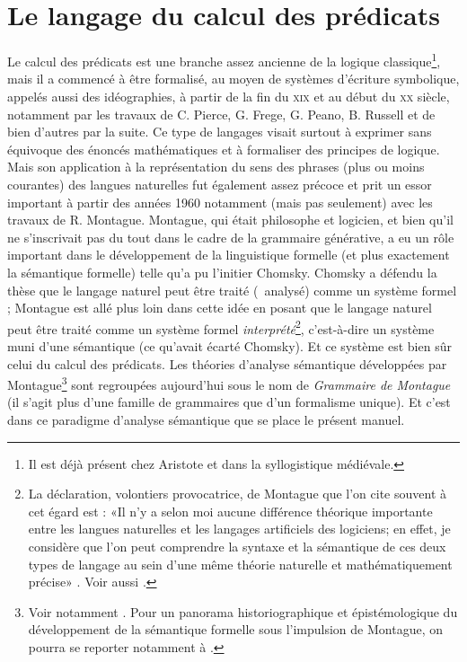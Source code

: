 \section{Le langage du calcul des prédicats}

Le calcul des prédicats est une branche assez ancienne de la logique
classique\footnote{Il est déjà présent chez Aristote et dans la
syllogistique médiévale.}, mais il a commencé à être formalisé, au
moyen de systèmes d'écriture symbolique, appelés aussi des
idéographies, à partir de la fin du \textsc{xix} et au début du \textsc{xx}
siècle, notamment par les travaux de C. Pierce, G. Frege, G. Peano,
B. Russell et de bien d'autres par la suite.  Ce type de langages
visait surtout à exprimer sans équivoque des énoncés mathématiques et
à formaliser des principes de logique.  Mais son application à la
représentation du sens des phrases (plus ou moins courantes) des
langues naturelles fut également assez précoce et prit un essor
important à partir des années 1960 notamment (mais pas seulement) avec les
travaux de R. Montague.  Montague, qui était philosophe et logicien,
et bien qu'il ne s'inscrivait pas du tout dans le cadre de la
grammaire générative, a eu un rôle important dans le développement de
la linguistique formelle (et plus exactement la sémantique formelle)
telle qu'a pu l'initier Chomsky.  Chomsky a défendu la thèse que le
langage naturel peut être traité (\ie\ analysé) comme un système formel ;
Montague est allé plus loin dans cette idée en posant que le langage
naturel peut être traité comme un système formel
\emph{interprété}\footnote{La déclaration, volontiers provocatrice, de
  Montague que l'on cite souvent à cet égard est : «Il
    n'y a selon   moi aucune différence théorique importante entre les langues
  naturelles et les langages artificiels des logiciens; en effet, je considère que l’on peut comprendre la syntaxe et la sémantique de ces deux types de langage au sein d’une même théorie naturelle et mathématiquement précise»
  \citep[373]{Montague:UG}.
Voir aussi \citet[6--7]{Bach:89}.},
c'est-à-dire un système muni d'une sémantique (ce qu'avait écarté
Chomsky).  Et ce système est bien sûr celui du calcul des prédicats.
Les théories d'analyse sémantique développées par Montague\footnote{Voir notamment \citet{Montague:EFL,Montague:UG,PTQ}. Pour un panorama historiographique et épistémologique du développement de la sémantique formelle sous l'impulsion de Montague, on pourra se reporter notamment à \cite{Partee:96,Partee:05}. } sont
regroupées aujourd'hui sous le nom de \emph{Grammaire de Montague} (il
s'agit plus d'une famille de grammaires que d'un formalisme unique).
Et c'est dans ce paradigme d'analyse sémantique que se place le
présent manuel.

